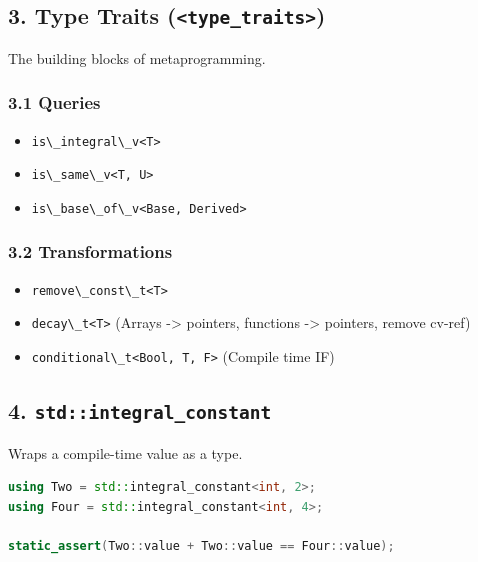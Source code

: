 \hypertarget{type-traits-type_traits}{%
\subsection{\texorpdfstring{3. Type Traits
(\texttt{\textless{}type\_traits\textgreater{}})}{3. Type Traits (\textless type\_traits\textgreater)}}\label{type-traits-type_traits}}

The building blocks of metaprogramming.

\hypertarget{queries}{%
\subsubsection{3.1 Queries}\label{queries}}

\begin{itemize}
\tightlist
\item
  \passthrough{\lstinline!is\_integral\_v<T>!}
\item
  \passthrough{\lstinline!is\_same\_v<T, U>!}
\item
  \passthrough{\lstinline!is\_base\_of\_v<Base, Derived>!}
\end{itemize}

\hypertarget{transformations}{%
\subsubsection{3.2 Transformations}\label{transformations}}

\begin{itemize}
\tightlist
\item
  \passthrough{\lstinline!remove\_const\_t<T>!}
\item
  \passthrough{\lstinline!decay\_t<T>!} (Arrays -\textgreater{}
  pointers, functions -\textgreater{} pointers, remove cv-ref)
\item
  \passthrough{\lstinline!conditional\_t<Bool, T, F>!} (Compile time IF)
\end{itemize}

\hypertarget{stdintegral_constant}{%
\subsection{\texorpdfstring{4.
\texttt{std::integral\_constant}}{4. std::integral\_constant}}\label{stdintegral_constant}}

Wraps a compile-time value as a type.

\begin{lstlisting}[language={C++}]
using Two = std::integral_constant<int, 2>;
using Four = std::integral_constant<int, 4>;

static_assert(Two::value + Two::value == Four::value);
\end{lstlisting}

